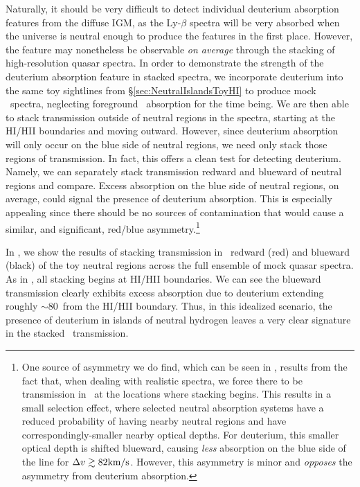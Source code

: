 Naturally, it should be very difficult to detect individual deuterium absorption features from the diffuse IGM, as the Ly-$\beta$ spectra will be very absorbed when the universe is neutral enough to
produce the features in the first place. However, the feature may nonetheless be observable \textit{on average} through the stacking of high-resolution quasar spectra. 
In order to demonstrate the strength of the deuterium absorption feature in stacked spectra, we incorporate deuterium into the same toy sightlines from \S \ref{sec:NeutralIslandsToyHI} to produce mock \lyb\ spectra, neglecting foreground \lya\ absorption for the time being. We are then able to stack transmission outside of neutral regions in the spectra, starting at the HI/HII boundaries and moving outward. However, since deuterium absorption will only occur on the blue side of neutral regions, we need only stack those regions of transmission. In fact, this offers a clean test for detecting deuterium. Namely, we can separately stack transmission redward and blueward of neutral regions and compare. Excess absorption on the blue side of neutral regions, on average, could signal the presence of deuterium absorption. This is especially appealing since there should be no sources of contamination that would cause a similar, and significant, red/blue asymmetry.\footnote{One source of asymmetry we do find, which can be seen in , results from the fact that, when dealing with realistic spectra, we force there to be transmission in \lyb\ at the locations where stacking begins. This results in a small selection effect, where selected neutral absorption systems have a reduced probability of having nearby neutral regions and have correspondingly-smaller nearby optical depths. For deuterium, this smaller optical depth is shifted blueward, causing \textit{less} absorption on the blue side of the line for $\Delta v \gtrsim 82\text{km}/\text{s}$. However, this asymmetry is minor and {\it opposes} the asymmetry from deuterium absorption.}


In , we show the results of stacking transmission in \lyb\ redward (red) and blueward (black) of the toy neutral regions across the full ensemble of mock quasar spectra. As in , all stacking begins at HI/HII boundaries. We can see the blueward transmission clearly exhibits excess absorption due to deuterium extending roughly $\sim$80\kms\ from the HI/HII boundary. Thus, in this idealized scenario, the presence of deuterium in islands of neutral hydrogen leaves a very clear signature in the stacked \lyb\ transmission.

